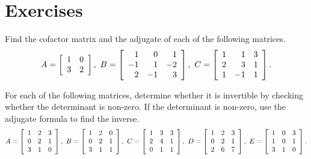 \documentclass{ximera}
\author{Zack Reed}
\begin{document}
\section*{Exercises}

\begin{example}
  Find the cofactor matrix and the adjugate of each of the following
  matrices.
  \begin{equation*}
    A =
    \startmat{rr}
      1 & 0 \\
      3 & 2 \\
    \stopmat,
    \quad
    B =
    \startmat{rrr}
      1  & 0  & 1  \\
      -1 & 1  & -2 \\
      2  & -1 & 3  \\
    \stopmat,
    \quad
    C =
    \startmat{rrr}
      1 &  1 & 3 \\
      2 &  3 & 1 \\
      1 & -1 & 1 \\
    \stopmat.
  \end{equation*}
\end{example}

\begin{example}
  For each of the following matrices, determine whether it is
  invertible by checking whether the determinant is non-zero. If the
  determinant is non-zero, use the adjugate formula to find the
  inverse.
  \begin{equation*}
    A =
    \startmat{rrr}
      1 & 2 & 3 \\
      0 & 2 & 1 \\
      3 & 1 & 0 \\
    \stopmat,
    \quad
    B =
    \startmat{rrr}
      1 & 2 & 0 \\
      0 & 2 & 1 \\
      3 & 1 & 1 \\
    \stopmat,
    \quad
    C =
    \startmat{rrr}
      1 & 3 & 3 \\
      2 & 4 & 1 \\
      0 & 1 & 1 \\
    \stopmat,
    \quad
    D =
    \startmat{rrr}
      1 & 2 & 3 \\
      0 & 2 & 1 \\
      2 & 6 & 7 \\
    \stopmat,
    \quad
    E =
    \startmat{rrr}
      1 & 0 & 3 \\
      1 & 0 & 1 \\
      3 & 1 & 0 \\
    \stopmat.
  \end{equation*}
\end{example}
\end{document}
